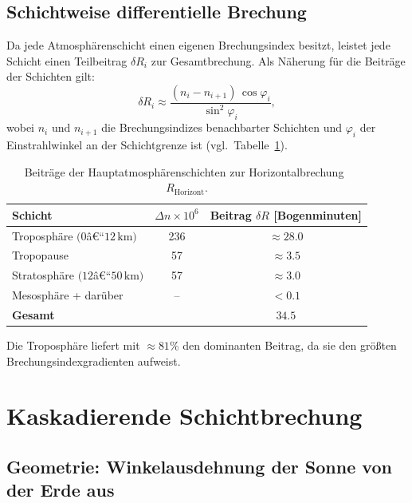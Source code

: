 ﻿\documentclass[12pt,a4paper]{article}
\begin{document}
\subsection{Schichtweise differentielle Brechung}

Da jede Atmosphärenschicht einen eigenen Brechungsindex besitzt,
leistet jede Schicht einen Teilbeitrag $\delta R_i$ zur Gesamtbrechung.
Als Näherung für die Beiträge der Schichten gilt:
\begin{equation}
  \delta R_i \approx
  \frac{(n_i - n_{i+1})\,\cos\varphi_i}{\sin^2\varphi_i},
  \label{eq:dR_schicht}
\end{equation}
wobei $n_i$ und $n_{i+1}$ die Brechungsindizes benachbarter Schichten
und $\varphi_i$ der Einstrahlwinkel an der Schichtgrenze ist
(vgl.\ Tabelle~\ref{tab:schicht_beitrag}).

\begin{table}[htbp]
\centering
\caption{Beiträge der Hauptatmosphärenschichten zur
         Horizontalbrechung~$R_{\text{Horizont}}$.}
\label{tab:schicht_beitrag}
\begin{tabular}{lcc}
\toprule
Schicht & $\Delta n \times 10^6$ & Beitrag $\delta R$ [Bogenminuten] \\
\midrule
Troposphäre $(0$â€“$12\,\text{km})$  & 236 & $\approx 28.0$ \\
Tropopause                          &  57 & $\approx  3.5$ \\
Stratosphäre $(12$â€“$50\,\text{km})$&  57 & $\approx  3.0$ \\
Mesosphäre + darüber                &  -- & $< 0.1$        \\
\midrule
\textbf{Gesamt}                    &     & $\mathbf{34.5}$ \\
\bottomrule
\end{tabular}
\end{table}

Die Troposphäre liefert mit $\approx 81\%$ den dominanten Beitrag,
da sie den größten Brechungsindexgradienten aufweist.

\section{Kaskadierende Schichtbrechung}
\label{sec:kaskade}

\subsection{Geometrie: Winkelausdehnung der Sonne von der Erde aus}
\end{document}

